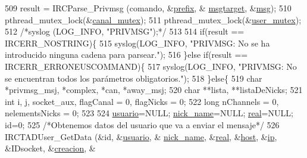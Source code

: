 \begin{DoxyCode}
{{{{{{{{{509                         result = IRCParse\_Privmsg (comando, &\hyperlink{_g-2361-06-_p1-_server_8c_ad2849cf781a4db22cc1b31eaaee50a4f}{prefix}, &
      \hyperlink{_g-2361-06-_p1-_server_8c_a968dcc7e43caeca7959f3c069dcccc6a}{msgtarget}, &\hyperlink{_g-2361-06-_p1-_server_8c_a32d2f5216cddb59c7cc8fb2806a7e727}{msg}); 
510                 pthread\_mutex\_lock(&\hyperlink{_g-2361-06-_p1-_server_8c_ab86a544a49de18195048bac54dd3ac3e}{canal\_mutex});
511                         pthread\_mutex\_lock(&\hyperlink{_g-2361-06-_p1-_server_8c_a5dedd07a1144d2ab70b74a8e64b6a7c0}{user\_mutex});
512                 \textcolor{comment}{/*syslog (LOG\_INFO, "PRIVMSG");*/}
513 
514                 \textcolor{keywordflow}{if}(result == IRCERR\_NOSTRING)\{
515                                 syslog(LOG\_INFO, \textcolor{stringliteral}{"PRIVMSG: No se ha introducido ninguna cadena para
       parsear."});
516                         \}\textcolor{keywordflow}{else} \textcolor{keywordflow}{if}(result == IRCERR\_ERRONEUSCOMMAND)\{
517                                 syslog(LOG\_INFO, \textcolor{stringliteral}{"PRIVMSG: No se encuentran todos los parámetros
       obligatorios."});
518                         \}\textcolor{keywordflow}{else}\{
519                                 \textcolor{keywordtype}{char} *privmsg\_msj, *complex, *can, *away\_msj;
520                                 \textcolor{keywordtype}{char} **lista, **listaDeNicks;
521                                 \textcolor{keywordtype}{int} i, j, socket\_aux, flagCanal = 0, flagNicks = 0;
522                                 \textcolor{keywordtype}{long} nChannels = 0, nelementsNicks = 0;
523 
524                                 \hyperlink{_g-2361-06-_p1-_server_8c_a0147a5b81499984f9cb00379a8cb84af}{usuario}=NULL; \hyperlink{_g-2361-06-_p1-_server_8c_aabbf66718cda228b924a4a9441eadf62}{nick\_name}=NULL; 
      \hyperlink{_g-2361-06-_p1-_server_8c_af832f551e1c343666c3d2a55834139a0}{real}=NULL; \textcolor{keywordtype}{id}=0;
525                                 \textcolor{comment}{/*Obtenemos datos del usuario que va a enviar el mensaje*/}
526                                 IRCTADUser\_GetData (&\textcolor{keywordtype}{id}, &\hyperlink{_g-2361-06-_p1-_server_8c_a0147a5b81499984f9cb00379a8cb84af}{usuario}, &
      \hyperlink{_g-2361-06-_p1-_server_8c_aabbf66718cda228b924a4a9441eadf62}{nick\_name}, &\hyperlink{_g-2361-06-_p1-_server_8c_af832f551e1c343666c3d2a55834139a0}{real}, &\hyperlink{_g-2361-06-_p1-_server_8c_a1c2046dcb30a629d6d9f45ff8f403f12}{host}, &\hyperlink{_g-2361-06-_p1-_server_8c_afbc356cd0e25d1dbbece7c10fd025fa6}{ip}, &IDsocket, &\hyperlink{_g-2361-06-_p1-_server_8c_a26292066ca0d17922eadee4161542ab9}{creacion}, &
}}}}}}}}}
\end{DoxyCode}
